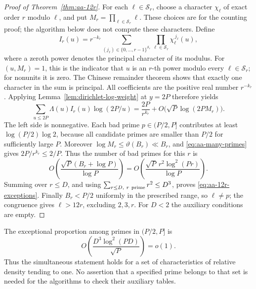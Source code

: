 \documentclass[11pt]{article}
\theoremstyle{definition}
\theoremstyle{remark}
\begin{document}
\begin{proof}[Proof of Theorem~\ref{thm:aa-12r}]
For each \(\ell\in\mathcal S_r\), choose a character
\(\chi_\ell\) of exact order \(r\) modulo \(\ell\), and put
\(M_r=\prod_{\ell\in\mathcal S_r}\ell\).
These choices are for the counting proof; the algorithm below
does not compute these characters. Define
\[
 I_r(u)=r^{-k_r}
   \sum_{(j_\ell)\in\{0,\ldots,r-1\}^{\mathcal S_r}}
       \prod_{\ell\in\mathcal S_r}\chi_\ell^{\,j_\ell}(u),
\]
where a zeroth power denotes the principal character of its modulus.
For \((u,M_r)=1\), this is the indicator that \(u\) is an \(r\)-th
power modulo every \(\ell\in\mathcal S_r\); for nonunits it is zero.
The Chinese remainder theorem shows that exactly one character
in the sum is principal. All coefficients are the positive real
number \(r^{-k_r}\). Applying Lemma~\ref{lem:dirichlet-log-weight} at
\(y=2P\) therefore yields
\[
 \sum_{u\leq2P}\Lambda(u)I_r(u)\log(2P/u)
 =\frac{2P}{r^{k_r}}
       +O\bigl(\sqrt P\log(2PM_r)\bigr).
\]
The left side is nonnegative. Each bad prime
\(p\in(P/2,P]\) contributes at least
\(\log(P/2)\log2\), because all candidate primes are smaller than
\(P/2\) for sufficiently large \(P\).
Moreover
\(\log M_r\leq\vartheta(B_r)\ll B_r\), and
\eqref{eq:aa-many-primes} gives \(2P/r^{k_r}\leq2/P\).
Thus the number of bad primes for this \(r\) is
\[
 O\!\left(
 \frac{\sqrt P(B_r+\log P)}{\log P}\right)
 =
 O\!\left(
 \frac{\sqrt P\,r^2\log^2(Pr)}{\log P}\right).
\]
Summing over \(r\leq D\), and using
\(\sum_{r\leq D,\ r\ {\rm prime}}r^2\leq D^3\), proves
\eqref{eq:aa-12r-exceptions}.
Finally \(B_r<P/2\) uniformly in the prescribed range, so
\(\ell\ne p\); the congruence gives \(\ell>12r\), excluding
\(2,3,r\). For \(D<2\) the auxiliary conditions are empty.
\end{proof}

The exceptional proportion among primes in \((P/2,P]\) is
\[
 O\!\left(\frac{D^3\log^2(PD)}{\sqrt P}\right)=o(1).
\]
Thus the simultaneous statement holds for a set of characteristics
of relative density tending to one. No assertion that a specified
prime belongs to that set is needed for the algorithms to check
their auxiliary tables.
\end{document}
